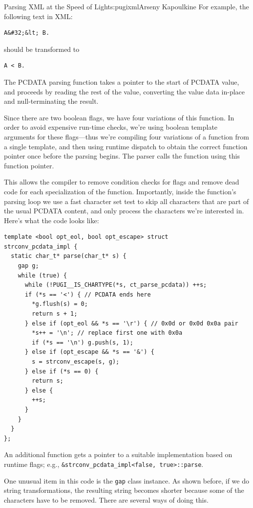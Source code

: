\begin{aosachapter}{Parsing XML at the Speed of Light}{s:pugixml}{Arseny Kapoulkine}
For example, the following text in XML:

\begin{verbatim}
A&#32;&lt; B.
\end{verbatim}

\noindent should be transformed to

\begin{verbatim}
A < B.
\end{verbatim}

The PCDATA parsing function takes a pointer to the start of PCDATA
value, and proceeds by reading the rest of the value, converting the
value data in-place and null-terminating the result.

Since there are two boolean flags, we have four variations of this
function. In order to avoid expensive run-time checks, we're using
boolean template arguments for these flags---thus we're compiling four
variations of a function from a single template, and then using runtime
dispatch to obtain the correct function pointer once before the parsing
begins. The parser calls the function using this function pointer.

This allows the compiler to remove condition checks for flags and remove
dead code for each specialization of the function. Importantly, inside
the function's parsing loop we use a fast character set test to skip all
characters that are part of the usual PCDATA content, and only process
the characters we're interested in. Here's what the code looks like:

\begin{verbatim}
template <bool opt_eol, bool opt_escape> struct
strconv_pcdata_impl {
  static char_t* parse(char_t* s) {
    gap g;
    while (true) {
      while (!PUGI__IS_CHARTYPE(*s, ct_parse_pcdata)) ++s;
      if (*s == '<') { // PCDATA ends here
        *g.flush(s) = 0;
        return s + 1;
      } else if (opt_eol && *s == '\r') { // 0x0d or 0x0d 0x0a pair
        *s++ = '\n'; // replace first one with 0x0a
        if (*s == '\n') g.push(s, 1);
      } else if (opt_escape && *s == '&') {
        s = strconv_escape(s, g);
      } else if (*s == 0) {
        return s;
      } else {
        ++s;
      }
    }
  }
};
\end{verbatim}

\noindent An additional function gets a pointer to a suitable
implementation based on runtime flags; e.g.,
\texttt{\&strconv\_pcdata\_impl\textless{}false, true\textgreater{}::parse}.

One unusual item in this code is the \texttt{gap} class instance. As
shown before, if we do string transformations, the resulting string
becomes shorter because some of the characters have to be removed. There
are several ways of doing this.


\end{aosachapter}
